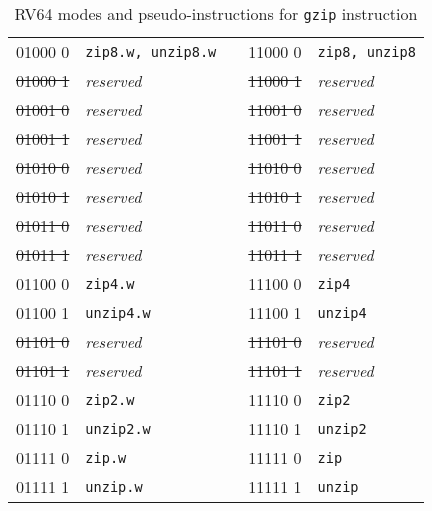 \begin{table}[h]
\begin{small}
\begin{center}
\begin{tabular}{c l p{1in} c l}
\cline{1-2}
\cline{4-5}

      01000 0  & {\tt zip8.w, unzip8.w}   &   &         11000 0  & {\tt zip8, unzip8}      \\
\sout{01000 1} & {\it reserved}           &   &   \sout{11000 1} & {\it reserved}          \\
\sout{01001 0} & {\it reserved}           &   &   \sout{11001 0} & {\it reserved}          \\
\sout{01001 1} & {\it reserved}           &   &   \sout{11001 1} & {\it reserved}          \\
\sout{01010 0} & {\it reserved}           &   &   \sout{11010 0} & {\it reserved}          \\
\sout{01010 1} & {\it reserved}           &   &   \sout{11010 1} & {\it reserved}          \\
\sout{01011 0} & {\it reserved}           &   &   \sout{11011 0} & {\it reserved}          \\
\sout{01011 1} & {\it reserved}           &   &   \sout{11011 1} & {\it reserved}          \\

\cline{1-2}
\cline{4-5}

      01100 0  & {\tt zip4.w}             &   &         11100 0  & {\tt zip4}              \\
      01100 1  & {\tt unzip4.w}           &   &         11100 1  & {\tt unzip4}            \\
\sout{01101 0} & {\it reserved}           &   &   \sout{11101 0} & {\it reserved}          \\
\sout{01101 1} & {\it reserved}           &   &   \sout{11101 1} & {\it reserved}          \\
      01110 0  & {\tt zip2.w}             &   &         11110 0  & {\tt zip2}              \\
      01110 1  & {\tt unzip2.w}           &   &         11110 1  & {\tt unzip2}            \\
      01111 0  & {\tt zip.w}              &   &         11111 0  & {\tt zip}               \\
      01111 1  & {\tt unzip.w}            &   &         11111 1  & {\tt unzip}             \\
\end{tabular}
\end{center}
\end{small}
\caption{RV64 modes and pseudo-instructions for {\tt gzip} instruction}
\label{gzip64-modes}
\end{table}

